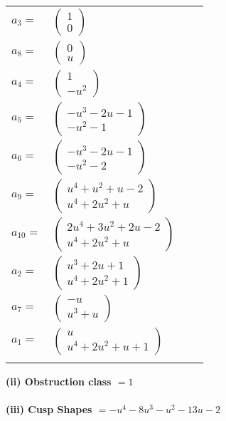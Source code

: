 \documentclass[1p]{elsarticle_modified}
\theoremstyle{definition}
\begin{document}
\begin{tabular}{m{7pt} m{180pt} m{7pt} m{180pt} }
\flushright $a_{3}=$&$\begin{pmatrix}1\\0\end{pmatrix}$ \\
\flushright $a_{8}=$&$\begin{pmatrix}0\\u\end{pmatrix}$ \\
\flushright $a_{4}=$&$\begin{pmatrix}1\\- u^2\end{pmatrix}$ \\
\flushright $a_{5}=$&$\begin{pmatrix}- u^3-2 u-1\\- u^2-1\end{pmatrix}$ \\
\flushright $a_{6}=$&$\begin{pmatrix}- u^3-2 u-1\\- u^2-2\end{pmatrix}$ \\
\flushright $a_{9}=$&$\begin{pmatrix}u^4+u^2+u-2\\u^4+2 u^2+u\end{pmatrix}$ \\
\flushright $a_{10}=$&$\begin{pmatrix}2 u^4+3 u^2+2 u-2\\u^4+2 u^2+u\end{pmatrix}$ \\
\flushright $a_{2}=$&$\begin{pmatrix}u^3+2 u+1\\u^4+2 u^2+1\end{pmatrix}$ \\
\flushright $a_{7}=$&$\begin{pmatrix}- u\\u^3+u\end{pmatrix}$ \\
\flushright $a_{1}=$&$\begin{pmatrix}u\\u^4+2 u^2+u+1\end{pmatrix}$\\&\end{tabular}
\flushleft \textbf{(ii) Obstruction class $= 1$}\\~\\
\flushleft \textbf{(iii) Cusp Shapes $= - u^4-8 u^3- u^2-13 u-2$}\\~\\
\end{document}
